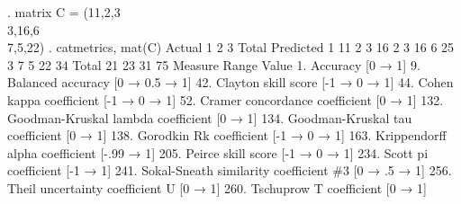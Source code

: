 . matrix C = (11,2,3 \\ 3,16,6 \\ 7,5,22)
{\smallskip}
. catmetrics, mat(C)
{\smallskip}
{}
{\smallskip}
    Actual {\VBAR}      1      2      3 {\VBAR}    Total 
 Predicted {\VBAR}                      {\VBAR}
         1 {\VBAR}     11      2      3 {\VBAR}       16 
         2 {\VBAR}      3     16      6 {\VBAR}       25 
         3 {\VBAR}      7      5     22 {\VBAR}       34 
     Total {\VBAR}     21     23     31 {\VBAR}       75 
{\smallskip}
{}
Measure                                               Range     Value
1. Accuracy                                         [0 → 1]  {}
9. Balanced accuracy                          [0 → 0.5 → 1]  {}
42. Clayton skill score                        [-1 → 0 → 1]  {}
44. Cohen kappa coefficient                    [-1 → 0 → 1]  {}
52. Cramer concordance coefficient                  [0 → 1]  {}
132. Goodman-Kruskal lambda coefficient             [0 → 1]  {}
134. Goodman-Kruskal tau coefficient                [0 → 1]  {}
138. Gorodkin Rk coefficient                   [-1 → 0 → 1]  {}
163. Krippendorff alpha coefficient              [-.99 → 1]  {}
205. Peirce skill score                        [-1 → 0 → 1]  {}
234. Scott pi coefficient                          [-1 → 1]  {}
241. Sokal-Sneath similarity coefficient \#3    [0 → .5 → 1]  {}
256. Theil uncertainty coefficient U                [0 → 1]  {}
260. Tschuprow T coefficient                        [0 → 1]  {}
{\smallskip}
{}
